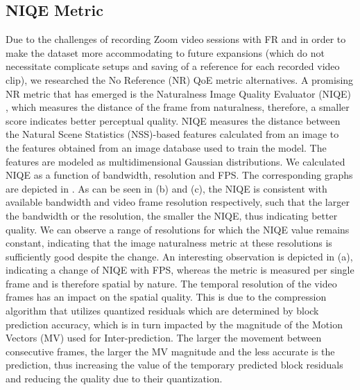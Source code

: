 \subsection{NIQE Metric}
Due to the challenges of recording Zoom video sessions with FR and in order to make the dataset more accommodating to future expansions (which do not necessitate complicate setups and saving of a reference for each recorded video clip), we researched the No Reference (NR) QoE metric alternatives. A promising NR metric that has emerged is the Naturalness Image Quality Evaluator (NIQE) \cite{mittal2012making}, which measures the distance of the frame from naturalness, therefore, a smaller score indicates better perceptual quality. NIQE measures the distance between the Natural Scene Statistics (NSS)-based features calculated from an image to the features obtained from an image database used to train the model. The features are modeled as multidimensional Gaussian distributions. We calculated NIQE as a function of bandwidth, resolution and FPS. The corresponding graphs are depicted in . As can be seen in  (b) and (c), the NIQE is consistent with available bandwidth and video frame resolution respectively, such that the larger the bandwidth or the resolution, the smaller the NIQE, thus indicating better quality.  We can observe a range of resolutions for which the NIQE value remains constant, indicating that the image naturalness metric at these resolutions is sufficiently good despite the change. An interesting observation is depicted in  (a), indicating a change of NIQE with FPS, whereas the metric is measured per single frame and is therefore spatial by nature. The temporal resolution of the video frames has an impact on the spatial quality. This is due to the compression algorithm that utilizes quantized residuals which are determined by block prediction accuracy, which is in turn impacted by the magnitude of the Motion Vectors (MV) used for Inter-prediction. The larger the movement between consecutive frames, the larger the MV magnitude and the less accurate is the prediction, thus increasing the value of the temporary predicted block residuals and reducing the quality due to their quantization.


